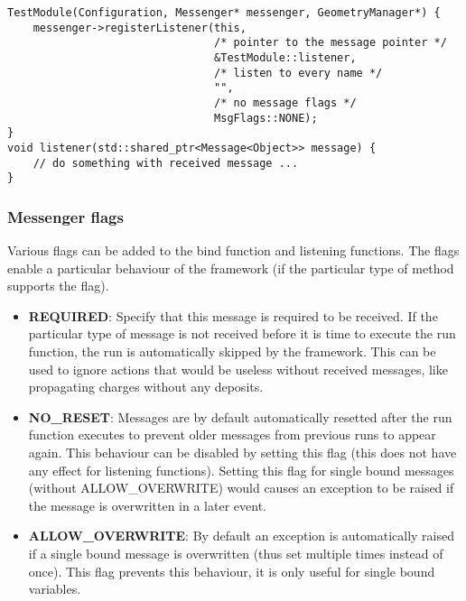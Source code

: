 \begin{enumerate}
\begin{verbatim}
TestModule(Configuration, Messenger* messenger, GeometryManager*) {
    messenger->registerListener(this,
                                /* pointer to the message pointer */
                                &TestModule::listener,
                                /* listen to every name */
                                "",
                                /* no message flags */
                                MsgFlags::NONE);
}
void listener(std::shared_ptr<Message<Object>> message) {
    // do something with received message ...
}
\end{verbatim}
\end{enumerate}

\subsubsection{Messenger flags}
Various flags can be added to the bind function and listening functions. The flags enable a particular behaviour of the framework (if the particular type of method supports the flag).
\begin{itemize}
\item \textbf{REQUIRED}: Specify that this message is required to be received. If the particular type of message is not received before it is time to execute the run function, the run is automatically skipped by the framework. This can be used to ignore actions that would be useless without received messages, like propagating charges without any deposits.
\item \textbf{NO\_RESET}: Messages are by default automatically resetted after the run function executes to prevent older messages from previous runs to appear again. This behaviour can be disabled by setting this flag (this does not have any effect for listening functions). Setting this flag for single bound messages (without ALLOW\_OVERWRITE) would causes an exception to be raised if the message is overwritten in a later event.
\item \textbf{ALLOW\_OVERWRITE}: By default an exception is automatically raised if a single bound message is overwritten (thus set multiple times instead of once). This flag prevents this behaviour, it is only useful for single bound variables. 
\end{itemize}

